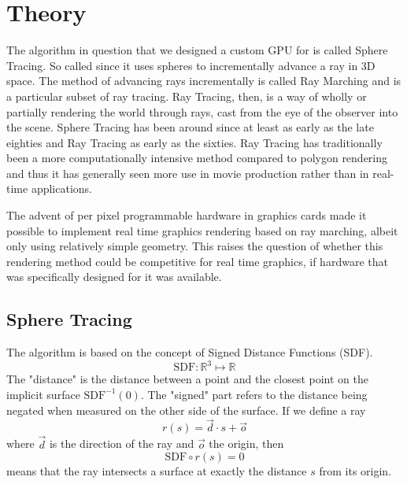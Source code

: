 \chapter{Theory}

	The algorithm in question that we designed a custom GPU for is called
	Sphere Tracing.\cite{Hart1996} So called since it uses spheres to
	incrementally advance a ray in 3D space. The method of advancing rays
	incrementally is called Ray Marching and is a particular subset of ray
	tracing.\cite{Whitted1980} Ray Tracing, then, is a way of wholly or
	partially rendering the world through rays, cast from the eye of the
	observer into the scene.  Sphere Tracing has been around since at least as
	early as the late eighties and Ray Tracing as early as the
	sixties.\cite{Hart1989,Appel1968} Ray Tracing has traditionally been a 
	more computationally intensive method compared to polygon
	rendering\cite{Wylie1967} and thus it has generally seen more use in movie
	production rather than in real-time applications.\cite{ref_needed?} 
	
	
	The advent of per pixel programmable hardware in graphics cards made it
	possible to implement real time graphics rendering based on ray marching, 
	albeit only using relatively simple geometry. This raises the question of 
	whether this rendering method could be competitive for real time graphics,
	if hardware that was specifically designed for it was available.
	
		
	\section{Sphere Tracing} 
	
		\begin{minipage}{0.6\textwidth} 
		
			The algorithm is based on the concept of Signed Distance Functions (SDF).
			$$\text{SDF}:\mathbb{R}^{3}\mapsto\mathbb{R}$$ 
			The "distance" is
			the distance between a point and the closest point on the implicit
			surface $\text{SDF}^{-1}(0)$. The "signed" part refers to the
			distance being negated when measured on the other side of the
			surface. If we define a ray $$r(s) = \vec{d} \cdot s + \vec{o}$$
			where $\vec{d}$ is the direction of the ray and $\vec{o}$ the origin,	then $$\text{SDF}\circ r(s) = 0$$ means that the ray
			intersects a surface at exactly the distance $s$ from its origin.
		
		\end{minipage} 
		

